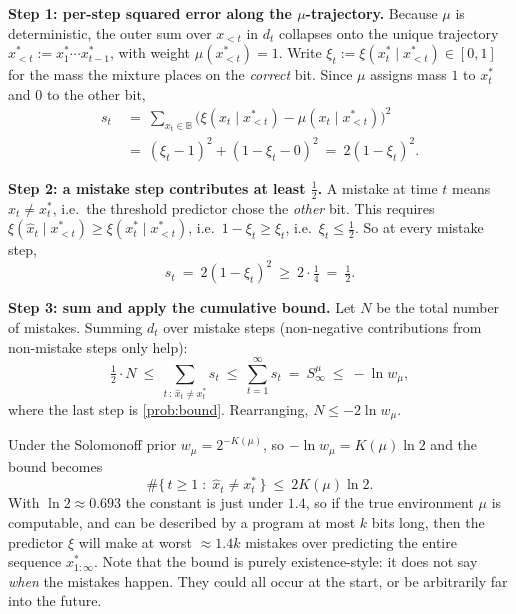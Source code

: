 \documentclass[fontsize=11pt, parskip=half]{scrartcl}
\begin{document}
\begin{solution}
\textbf{Step 1: per-step squared error along the $\mu$-trajectory.}
Because $\mu$ is deterministic, the outer sum over $x_{<t}$ in $d_t$ collapses
onto the unique trajectory $x_{<t}^* := x_1^* \cdots x_{t-1}^*$, with weight
$\mu(x_{<t}^*) = 1$. Write $\xi_t := \xi(x_t^* \mid x_{<t}^*) \in [0,1]$ for the
mass the mixture places on the \emph{correct} bit. Since $\mu$ assigns mass $1$
to $x_t^*$ and $0$ to the other bit,
\begin{align*}
  s_t ~&=~ \sum_{x_t \in \mathbb{B}} \big(\xi(x_t \mid x_{<t}^*) - \mu(x_t \mid x_{<t}^*)\big)^2 \\
  ~&=~ (\xi_t - 1)^2 + (1 - \xi_t - 0)^2 ~=~ 2(1 - \xi_t)^2.
\end{align*}

\textbf{Step 2: a mistake step contributes at least $\tfrac12$.}
A mistake at time $t$ means $\hat{x}_t \neq x_t^*$, i.e.\ the threshold predictor
chose the \emph{other} bit. This requires
$\xi(\hat{x}_t \mid x_{<t}^*) \geq \xi(x_t^* \mid x_{<t}^*)$, i.e.\
$1 - \xi_t \geq \xi_t$, i.e.\ $\xi_t \leq \tfrac12$. So at every mistake step,
\[
  s_t ~=~ 2(1 - \xi_t)^2 ~\geq~ 2 \cdot \tfrac{1}{4} ~=~ \tfrac12.
\]

\textbf{Step 3: sum and apply the cumulative bound.}
Let $N$ be the total number of mistakes. Summing $d_t$ over mistake steps
(non-negative contributions from non-mistake steps only help):
\[
  \tfrac12 \cdot N
  ~\leq~ \sum_{t \,:\, \hat{x}_t \neq x_t^*} s_t
  ~\leq~ \sum_{t=1}^\infty s_t ~=~ S^\mu_\infty
  ~\leq~ -\ln w_\mu,
\]
where the last step is \cref{prob:bound}. Rearranging, $N \leq -2 \ln w_\mu$.
\qedhere
\end{solution}

\begin{remark}
Under the Solomonoff prior $w_\mu = 2^{-K(\mu)}$, so $-\ln w_\mu = K(\mu)\ln 2$
and the bound becomes
\[
  \#\{\, t \geq 1 \;:\; \hat{x}_t \neq x_t^* \,\} ~\leq~ 2 K(\mu) \ln 2.
\]
With $\ln 2 \approx 0.693$ the constant is just under $1.4$, so if the true 
environment $\mu$ is computable, and can be described by a program at most $k$ bits long, 
then the predictor $\xi$ 
will make at worst $\approx 1.4 k$ mistakes over predicting the entire sequence $x^*_{1:\infty}$.
Note that the bound is purely existence-style: it does not say \emph{when}
the mistakes happen. They could all occur at the start, or be arbitrarily far into the future.
\end{remark}
\end{document}
